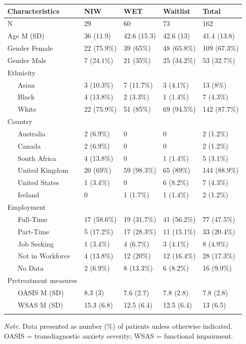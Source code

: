 \documentclass[
  man,floatsintext]{apa7}
\begin{document}
\begin{table}[tbp]
\begin{center}
\begin{threeparttable}
\begin{tabular}{lllll}
\toprule
Characteristics & NIW & WET & Waitlist & Total\\
\midrule
N & 29 & 60 & 73 & 162\\
Age M (SD) & 36 (11.9) & 42.6 (15.3) & 42.6 (13) & 41.4 (13.8)\\
Gender Female & 22 (75.9\%) & 39 (65\%) & 48 (65.8\%) & 109 (67.3\%)\\
Gender Male & 7 (24.1\%) & 21 (35\%) & 25 (34.2\%) & 53 (32.7\%)\\
Ethnicity &  &  &  & \\
\ \ \ Asian & 3 (10.3\%) & 7 (11.7\%) & 3 (4.1\%) & 13 (8\%)\\
\ \ \ Black & 4 (13.8\%) & 2 (3.3\%) & 1 (1.4\%) & 7 (4.3\%)\\
\ \ \ White & 22 (75.9\%) & 51 (85\%) & 69 (94.5\%) & 142 (87.7\%)\\
Country &  &  &  & \\
\ \ \ Australia & 2 (6.9\%) & 0 & 0 & 2 (1.2\%)\\
\ \ \ Canada & 2 (6.9\%) & 0 & 0 & 2 (1.2\%)\\
\ \ \ South Africa & 4 (13.8\%) & 0 & 1 (1.4\%) & 5 (3.1\%)\\
\ \ \ United Kingdom & 20 (69\%) & 59 (98.3\%) & 65 (89\%) & 144 (88.9\%)\\
\ \ \ United States & 1 (3.4\%) & 0 & 6 (8.2\%) & 7 (4.3\%)\\
\ \ \ Ireland & 0 & 1 (1.7\%) & 1 (1.4\%) & 2 (1.2\%)\\
Employment &  &  &  & \\
\ \ \ Full-Time & 17 (58.6\%) & 19 (31.7\%) & 41 (56.2\%) & 77 (47.5\%)\\
\ \ \ Part-Time & 5 (17.2\%) & 17 (28.3\%) & 11 (15.1\%) & 33 (20.4\%)\\
\ \ \ Job Seeking & 1 (3.4\%) & 4 (6.7\%) & 3 (4.1\%) & 8 (4.9\%)\\
\ \ \ Not in Workforce & 4 (13.8\%) & 12 (20\%) & 12 (16.4\%) & 28 (17.3\%)\\
\ \ \ No Data & 2 (6.9\%) & 8 (13.3\%) & 6 (8.2\%) & 16 (9.9\%)\\
Pretreatment measures &  &  &  & \\
\ \ \ OASIS M (SD) & 8.3 (3) & 7.6 (2.7) & 7.8 (2.8) & 7.8 (2.8)\\
\ \ \ WSAS M (SD) & 15.3 (6.8) & 12.5 (6.4) & 12.5 (6.4) & 13 (6.5)\\
\bottomrule
\addlinespace
\end{tabular}

\begin{tablenotes}[para]
\normalsize{\textit{Note.} Data presented as number (\%) of patients unless otherwise indicated. OASIS = transdiagnostic anxiety severity; WSAS = functional impairment.}
\end{tablenotes}

\end{threeparttable}
\end{center}

\end{table}
\end{document}
